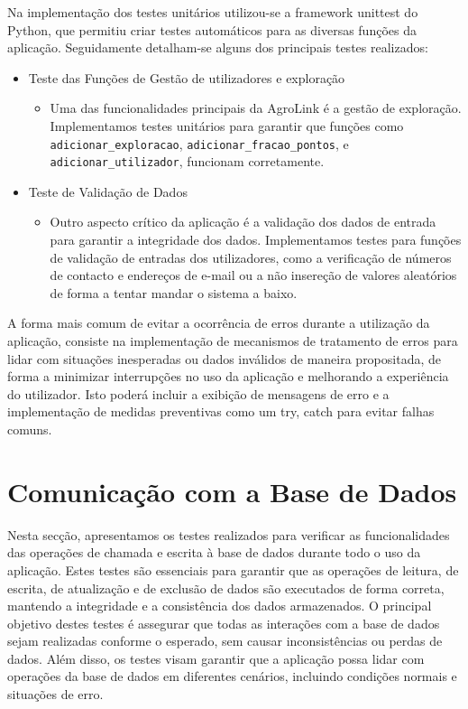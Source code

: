 \documentclass[a4paper,12pt]{report}
\begin{document}
	Na implementação dos testes unitários utilizou-se a framework unittest do Python, que permitiu criar testes automáticos para as diversas funções da aplicação. Seguidamente detalham-se alguns dos principais testes realizados: 
	
			\begin{itemize}
				\item Teste das Funções de Gestão de utilizadores e exploração
				\begin{itemize}
					\item Uma das funcionalidades principais da AgroLink é a gestão de exploração. Implementamos testes unitários para garantir que funções como \texttt{adicionar\_exploracao}, \texttt{adicionar\_fracao\_pontos}, e \texttt{adicionar\_utilizador}, funcionam corretamente.
				\end{itemize}
				
				\item Teste de Validação de Dados
				\begin{itemize}
					\item Outro aspecto crítico da aplicação é a validação dos dados de entrada para garantir a integridade dos dados. Implementamos testes para funções de validação de entradas dos utilizadores, como a verificação de números de contacto e endereços de e-mail ou a não insereção de valores aleatórios de forma a tentar mandar o sistema a baixo.
					
				\end{itemize}
				
			\end{itemize}

	A forma mais comum de evitar a ocorrência de erros durante a utilização da aplicação, consiste na implementação de mecanismos de tratamento de erros para lidar com situações inesperadas ou dados inválidos de maneira propositada, de forma a minimizar interrupções no uso da aplicação e melhorando a experiência do utilizador. Isto poderá incluir a exibição de mensagens de erro e a implementação de medidas preventivas como um try, catch para evitar falhas comuns. 
	
	\section{Comunicação com a Base de Dados}
		
	Nesta secção, apresentamos os testes realizados para verificar as funcionalidades das operações de chamada e escrita à base de dados durante todo o uso da aplicação. Estes testes são essenciais para garantir que as operações de leitura, de escrita, de atualização e de exclusão de dados são executados de forma correta, mantendo a integridade e a consistência dos dados armazenados. O principal objetivo destes testes é assegurar que todas as interações com a base de dados sejam realizadas conforme o esperado, sem causar inconsistências ou perdas de dados. Além disso, os testes visam garantir que a aplicação possa lidar com operações da base de dados em diferentes cenários, incluindo condições normais e situações de erro.
\end{document}
